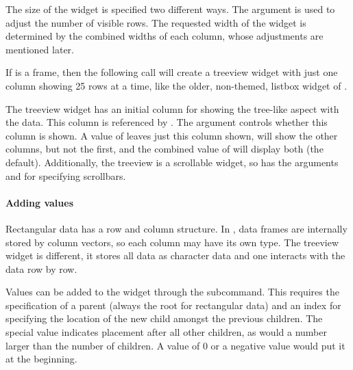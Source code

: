 The size of the widget is specified two different ways.  The
 argument is used to adjust the number
of visible rows. The requested width of the widget is determined by
the combined widths of each column, whose adjustments are mentioned
later.



If  is a frame, then the following call will create a treeview
widget with just one column showing 25 rows at a time, like the older,
non-themed, listbox widget of \Tk.

\begin{Schunk}
\end{Schunk}



The treeview widget has an initial column for showing the tree-like
aspect with the data. This column is referenced by . The
 argument controls whether this column is
shown. A value of  leaves just this column shown,
 will show the other columns, but not the first, and
the combined value of  will display both (the
default).  Additionally, the treeview is a scrollable widget, so has
the arguments  and
 for specifying scrollbars.

\paragraph{Adding values}

Rectangular data has a row and column structure. In \R, data frames
are internally stored by column vectors, so each column may have its
own type. The treeview widget is different, it stores all data as
character data and one interacts with the data row by row.

Values can be added to the widget through the
subcommand. This requires the specification of a parent (always the root
\qcode{} for rectangular data) and an index for specifying the
location of the new child amongst the previous children. The special
value  indicates placement after all other children, as
would a number larger than the number of children. A value of 0 or a
negative value would put it at the beginning.


